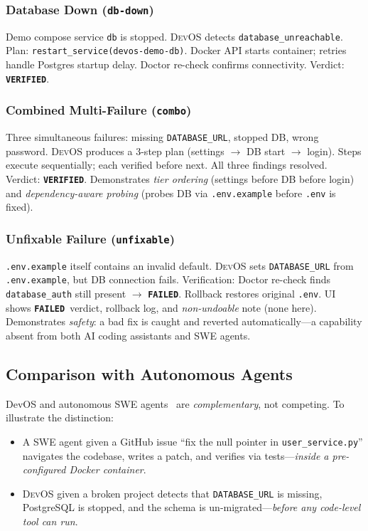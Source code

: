 \documentclass[conference,10pt,caption=false]{IEEEtran}
\newcommand{\devos}{\textsc{DevOS}\xspace}
\newcommand{\vpass}{\textcolor{green!60!black}{\textbf{\texttt{VERIFIED}}}}
\newcommand{\vfail}{\textcolor{red!60!black}{\textbf{\texttt{FAILED}}}}
\begin{document}
\subsubsection{Database Down (\texttt{db-down})}
Demo compose service \texttt{db} is stopped. \devos detects \texttt{database\_unreachable}. Plan: \texttt{restart\_service(devos-demo-db)}. Docker API starts container; retries handle Postgres startup delay. Doctor re-check confirms connectivity. Verdict: \vpass.

\subsubsection{Combined Multi-Failure (\texttt{combo})}
Three simultaneous failures: missing \texttt{DATABASE\_URL}, stopped DB, wrong password. \devos produces a 3-step plan (settings $\to$ DB start $\to$ login). Steps execute sequentially; each verified before next. All three findings resolved. Verdict: \vpass. Demonstrates \textit{tier ordering} (settings before DB before login) and \textit{dependency-aware probing} (probes DB via \texttt{.env.example} before \texttt{.env} is fixed).

\subsubsection{Unfixable Failure (\texttt{unfixable})}
\texttt{.env.example} itself contains an invalid default. \devos sets \texttt{DATABASE\_URL} from \texttt{.env.example}, but DB connection fails. Verification: Doctor re-check finds \texttt{database\_auth} still present $\to$ \vfail. Rollback restores original \texttt{.env}. UI shows \vfail\ verdict, rollback log, and \textit{non-undoable} note (none here). Demonstrates \textit{safety}: a bad fix is caught and reverted automatically---a capability absent from both AI coding assistants and SWE agents.

\subsection{Comparison with Autonomous Agents}
\label{sec:agent-comparison}
DevOS and autonomous SWE agents~\cite{swe-agent, autocoderover, devin} are \textit{complementary}, not competing. To illustrate the distinction:

\begin{itemize}[leftmargin=*, nosep]
    \item A SWE agent given a GitHub issue ``fix the null pointer in \texttt{user\_service.py}'' navigates the codebase, writes a patch, and verifies via tests---\textit{inside a pre-configured Docker container}.
    \item \devos given a broken project detects that \texttt{DATABASE\_URL} is missing, PostgreSQL is stopped, and the schema is un-migrated---\textit{before any code-level tool can run}.
\end{itemize}
\end{document}
